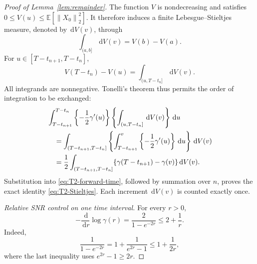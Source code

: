 \documentclass[11pt]{article}
\theoremstyle{definition}
\newcommand{\E}{\mathbb{E}}
\newcommand{\norm}[1]{\left\lVert #1\right\rVert_2}
\newcommand{\dd}{\,\mathrm{d}}
\begin{document}
\begin{proof}[Proof of Lemma~\ref{lem:remainder}]
The function $V$ is nondecreasing and satisfies
$0\le V(u)\le\E\left[\norm{X_0}^2\right]$. It therefore induces a
finite Lebesgue--Stieltjes measure, denoted by $\dd V(v)$, through
\[
    \int_{(a,b]}\dd V(v)=V(b)-V(a).
\]
For $u\in[T-t_{n+1},T-t_n]$,
\[
    V(T-t_n)-V(u)=\int_{(u,T-t_n]}\dd V(v).
\]
All integrands are nonnegative. Tonelli's theorem thus permits the
order of integration to be exchanged:
\begin{align}
&\int_{T-t_{n+1}}^{T-t_n}
 \left\{-\frac12\gamma'(u)\right\}
 \left\{\int_{(u,T-t_n]}\dd V(v)\right\}\dd u
 \notag\\
&\quad=
\int_{(T-t_{n+1},T-t_n]}
\left\{
   \int_{T-t_{n+1}}^v
   \left\{-\frac12\gamma'(u)\right\}\dd u
\right\}\dd V(v)
\notag\\
&\quad=
\frac12
\int_{(T-t_{n+1},T-t_n]}
\{\gamma(T-t_{n+1})-\gamma(v)\}\dd V(v).
\label{eq:Tonelli-Stieltjes}
\end{align}
Substitution into \eqref{eq:T2-forward-time}, followed by summation
over $n$, proves the exact identity \eqref{eq:T2-Stieltjes}. Each
increment $\dd V(v)$ is counted exactly once.

\medskip\noindent\emph{Relative SNR control on one time interval.}
For every $r>0$,
\begin{equation}
    -\frac{\dd}{\dd r}\log\gamma(r)
    =\frac{2}{1-e^{-2r}}
    \le2+\frac1r.
    \label{eq:log-SNR-derivative}
\end{equation}
Indeed,
\[
    \frac{1}{1-e^{-2r}}
    =1+\frac{1}{e^{2r}-1}
    \le1+\frac{1}{2r},
\]
where the last inequality uses $e^{2r}-1\ge2r$.


\end{proof}
\end{document}
